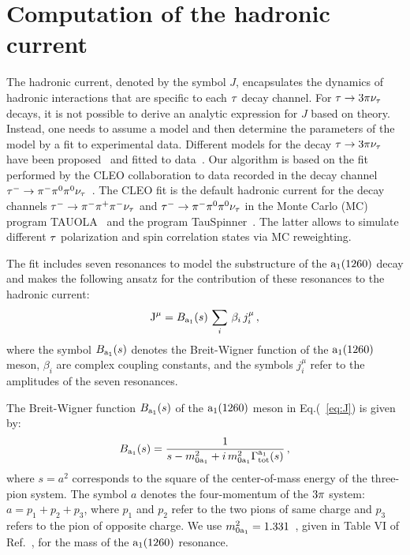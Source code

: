 \section{Computation of the hadronic current}
\label{sec:HadronicCurrent}

The hadronic current, denoted by the symbol $J$, encapsulates the dynamics of hadronic interactions that are specific to each $\tau$ decay channel.
For $\tau \to 3 \pi\nu_{\tau}$ decays,
it is not possible to derive an analytic expression for $J$ based on theory.
Instead, one needs to assume a model and then determine the parameters of the model by a fit to experimental data.
Different models for the decay $\tau \to 3 \pi\nu_{\tau}$ have been proposed~\cite{Bowler:1988kf,Isgur:1988vm,Kuhn:1990ad,Feindt:1990ev,Kuhn:1992nz,Ecker:1988te,Ecker:1989yg,Dumm:2009va} and fitted to data~\cite{ARGUS:1992olh,OPAL:1997was,DELPHI:1998bhv,Shekhovtsova:2012ra,Nugent:2013hxa}.
Our algorithm is based on the fit performed by the CLEO collaboration to data recorded in the decay channel $\tau^{-} \to \pi^{-}\pi^{\textrm{0}}\pi^{\textrm{0}}\nu_{\tau}$~\cite{CLEO:1999rzk}.
The CLEO fit is the default hadronic current for the decay channels $\tau^{-} \to \pi^{-}\pi^{+}\pi^{-}\nu_{\tau}$ and $\tau^{-} \to \pi^{-}\pi^{\textrm{0}}\pi^{\textrm{0}}\nu_{\tau}$ in the Monte Carlo (MC) program \textsc{TAUOLA}~\cite{Jadach:1990mz}
and the program TauSpinner~\cite{Przedzinski:2018ett}. The latter allows to simulate different $\tau$ polarization and spin correlation states via MC reweighting.

The fit includes seven resonances to model the substructure of the $\textrm{a}_{1}\textrm{(1260)}$ decay and makes the following ansatz for the contribution of these resonances to the hadronic current:
\begin{equation}
\textrm{J}^{\mu} = B_{\textrm{a}_{1}}(s) \, \sum_{i} \, \beta_{i} \, j_{i}^{\mu} \, ,
\label{eq:J}
\end{equation}
where the symbol $B_{\textrm{a}_{1}}(s)$ denotes the Breit-Wigner function of the $\textrm{a}_{1}\textrm{(1260)}$ meson, $\beta_{i}$ are complex coupling constants, and the symbols $j_{i}^{\mu}$ refer to the amplitudes of the seven resonances.

The Breit-Wigner function $B_{\textrm{a}_{1}}(s)$ of the $\textrm{a}_{1}\textrm{(1260)}$ meson in Eq.(~\ref{eq:J}) is given by:
\begin{equation}
B_{\textrm{a}_{1}}(s) = \frac{1}{s - m_{0\textrm{a}_{1}}^{2} + i \, m_{0\textrm{a}_{1}}^{2} \Gamma_{\textrm{tot}}^{\textrm{a}_{1}}(s)} \, ,
\label{eq:Ba1}
\end{equation}
where $s = a^{2}$ corresponds to the square of the center-of-mass energy of the three-pion system.
The symbol $a$ denotes the four-momentum of the $3 \pi$ system: $a = p_{1} + p_{2} + p_{3}$,
where $p_{1}$ and $p_{2}$ refer to the two pions of same charge and $p_{3}$ refers to the pion of opposite charge.
We use $m_{0\textrm{a}_{1}}^{2} = 1.331$~\GeV, given in Table VI of Ref.~\cite{CLEO:1999rzk}, for the mass of the $\textrm{a}_{1}\textrm{(1260)}$ resonance.

